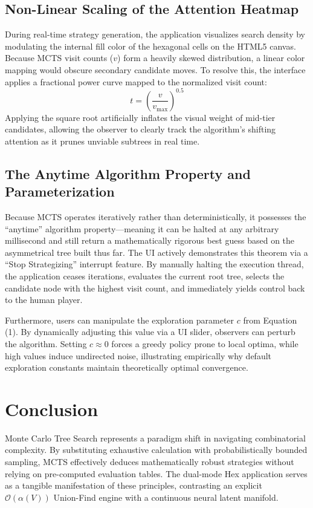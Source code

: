 \documentclass[12pt,a4paper]{article}
\begin{document}
\subsection{Non-Linear Scaling of the Attention Heatmap}
During real-time strategy generation, the application visualizes search density by modulating the internal fill color of the hexagonal cells on the HTML5 canvas. Because MCTS visit counts ($v$) form a heavily skewed distribution, a linear color mapping would obscure secondary candidate moves. To resolve this, the interface applies a fractional power curve mapped to the normalized visit count:
\begin{equation}
    t = \left(\frac{v}{v_{\text{max}}}\right)^{0.5}
\end{equation}
Applying the square root artificially inflates the visual weight of mid-tier candidates, allowing the observer to clearly track the algorithm's shifting attention as it prunes unviable subtrees in real time.

\subsection{The Anytime Algorithm Property and Parameterization}
Because MCTS operates iteratively rather than deterministically, it possesses the ``anytime'' algorithm property—meaning it can be halted at any arbitrary millisecond and still return a mathematically rigorous best guess based on the asymmetrical tree built thus far. The UI actively demonstrates this theorem via a ``Stop Strategizing'' interrupt feature. By manually halting the execution thread, the application ceases iterations, evaluates the current root tree, selects the candidate node with the highest visit count, and immediately yields control back to the human player.

Furthermore, users can manipulate the exploration parameter $c$ from Equation (1). By dynamically adjusting this value via a UI slider, observers can perturb the algorithm. Setting $c \approx 0$ forces a greedy policy prone to local optima, while high values induce undirected noise, illustrating empirically why default exploration constants maintain theoretically optimal convergence.

\section{Conclusion}
Monte Carlo Tree Search represents a paradigm shift in navigating combinatorial complexity. By substituting exhaustive calculation with probabilistically bounded sampling, MCTS effectively deduces mathematically robust strategies without relying on pre-computed evaluation tables. The dual-mode Hex application serves as a tangible manifestation of these principles, contrasting an explicit $\mathcal{O}(\alpha(V))$ Union-Find engine with a continuous neural latent manifold.
\end{document}
